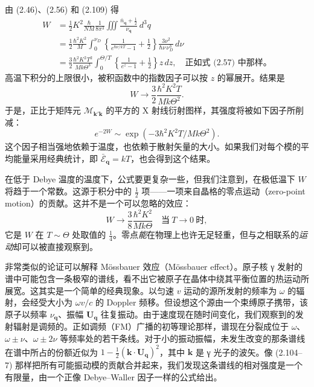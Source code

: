 由 (2.46)、(2.56) 和 (2.109) 得
\begin{align*}
W&=\frac{1}{2}K^{2}\frac{\hbar}{NM}\frac{1}{8\pi^{3}}\iiint\frac{\bar{n}_{\mathbf{q}}+\frac{1}{2}}{\nu_{\mathbf{q}}}\,d^{3}q\\
&=\frac{1}{2}\frac{\hbar^{2}K^{2}}{M}\int_{0}^{\nu_{D}}\left\{\frac{1}{e^{\hbar\nu/kT}-1}+\frac{1}{2}\right\}\frac{3\nu^{2}}{\hbar\nu\,\nu_{D}^{3}}\,d\nu\\
&=\frac{3}{2}\frac{\hbar^{2}K^{2}T^{2}}{Mk\Theta^{3}}\int_{0}^{\Theta/T}\left\{\frac{1}{e^{z}-1}+\frac{1}{2}\right\}z\,dz,\quad\text{正如式 (2.57) 中那样。}
\tag{2.111}
\end{align*}
高温下积分的上限很小，被积函数中的指数因子可以按 $z$ 的幂展开。结果是
\begin{equation*}
W\to\frac{3}{2}\frac{\hbar^{2}K^{2}T}{Mk\Theta^{2}}.
\tag{2.112}
\end{equation*}
于是，正比于矩阵元 $\mathcal{M}_{\mathbf{k}'\mathbf{k}}$ 的平方的 X 射线衍射图样，其强度将被如下因子所削减：
\begin{equation*}
e^{-2W}\sim\exp(-3\hbar^{2}K^{2}T/Mk\Theta^{2}).
\tag{2.113}
\end{equation*}
这个因子相当强地依赖于温度，也依赖于散射矢量的大小。如果我们对每个模的平均能量采用经典统计，即 $\bar{\mathcal{E}}_{\mathbf{q}}=kT$，也会得到这个结果。

在低于 Debye 温度的温度下，公式要更复杂一些，但我们注意到，在极低温下 $W$ 将趋于一个常数。这源于积分中的 $\frac{1}{2}$ 项——一项来自晶格的零点运动（zero-point motion）的贡献。这并不是一个可以忽略的效应：
\begin{equation*}
W\to\frac{3}{8}\frac{\hbar^{2}K^{2}}{Mk\Theta}\quad\text{当}\ T\to 0\ \text{时},
\tag{2.114}
\end{equation*}
它是 $W$ 在 $T\sim\Theta$ 处取值的 $\frac{1}{4}$。零点\emph{能}在物理上也许无足轻重，但与之相联系的\emph{运动}却可以被直接观察到。

非常类似的论证可以解释 Mössbauer 效应（Mössbauer effect）。原子核 γ 发射的谱中可能包含一条极窄的谱线，看不出它被原子在晶体中绕其平衡位置的热运动所展宽。这其实是一个简单的经典现象。以匀速 $v$ 运动的源所发射的频率为 $\omega$ 的辐射，会经受大小为 $\omega v/c$ 的 Doppler 频移。但设想这个源由一个束缚原子携带，该原子以频率 $\nu_{\mathbf{q}}$、振幅 $\mathbf{U}_{\mathbf{q}}$ 往复振动。由于速度现在随时间变化，我们观察到的发射辐射是调频的。正如调频（FM）广播的初等理论那样，谱现在分裂成位于 $\omega$、$\omega\pm\nu$、$\omega\pm2\nu$ 等频率处的若干条线。对于小的振动振幅，未发生改变的那条谱线在谱中所占的份额近似为 $1-\frac{1}{2}(\mathbf{k}\cdot\mathbf{U}_{\mathbf{q}})^{2}$，其中 $\mathbf{k}$ 是 γ 光子的波矢。像 (2.104–7) 那样把所有可能振动模的贡献合并起来，我们发现这条谱线的相对强度是一个有限量，由一个正像 Debye–Waller 因子一样的公式给出。


